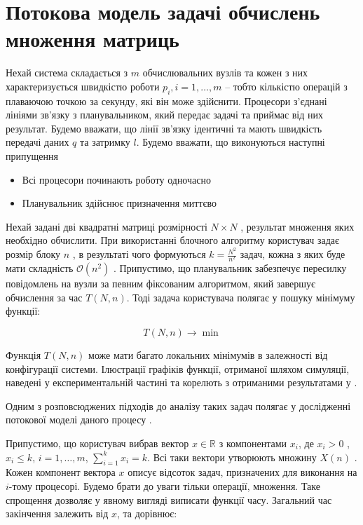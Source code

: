 
\section{Потокова модель задачі обчислень множення матриць}

Нехай система складається з $m$ обчислювальних вузлів та кожен з них характеризується швидкістю роботи $p_i , i=1,\ldots,m$ – тобто кількістю операцій з плаваючою точкою за секунду, які він може здійснити. Процесори з’єднані лініями зв’язку з планувальником, який передає задачі та приймає від них результат. Будемо вважати, що лінії зв’язку ідентичні та мають швидкість передачі даних $q$ та затримку $l$.
Будемо вважати, що виконуються наступні припущення
\begin{itemize}
	\item Всі процесори починають роботу одночасно
	\item Планувальник здійснює призначення миттєво
\end{itemize}

Нехай задані дві квадратні матриці розмірності $N \times N$ , результат множення яких необхідно обчислити. При використанні блочного алгоритму користувач задає розмір блоку $n$ , в результаті чого формуються $k=\frac{N^2}{n^2}$  задач, кожна з яких буде мати складність $\mathcal{O}(n^2)$ . Припустимо, що планувальник забезпечує пересилку повідомлень на вузли за певним фіксованим алгоритмом, який завершує обчислення за час $T(N,n)$. Тоді задача користувача полягає у пошуку мінімуму функції:

\begin{equation}
	\label{eq:general_minimization_problem}
	T(N,n) \longrightarrow \min
\end{equation}

Функція $T(N,n)$ може мати багато локальних мінімумів в залежності від конфігурації системи. Ілюстрації графіків функції, отриманої шляхом симуляції, наведені у експериментальній частині та корелють з отриманими результатами у \cite{DoroshenkoIgnatenkoIvanenko}.

Одним з розповсюджених підходів до аналізу таких задач полягає у дослідженні потокової моделі даного процесу \cite{FluidModelForJobScheduling}.

Припустимо, що користувач вибрав вектор $x \in \mathbb{R}$ з компонентами $x_i$, де $x_i > 0$ , $x_i \le k$, $i=1,\ldots,m$, $\sum_{i=1}^{k}x_i = k$. Всі таки вектори утворюють множину $X(n)$ . Кожен компонент вектора $x$ описує відсоток задач, призначених для виконання на  $i$-тому процесорі. Будемо брати до уваги тільки операції, множення. Таке спрощення дозволяє у явному вигляді виписати функції часу. Загальний час закінчення залежить від  $x$, та дорівнює:

